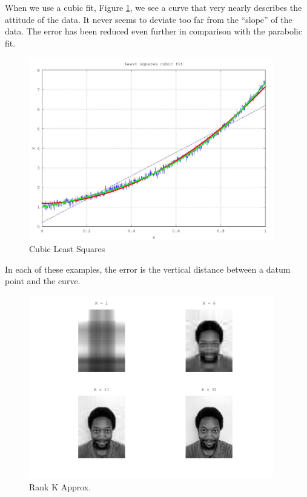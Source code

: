 \documentclass[12pt,letterpaper]{article}
\begin{document}
  \pagebreak

  When we use a cubic fit, Figure \ref{fig:cubic_least_squares}, we see a curve that very nearly describes the attitude of the data. It never seems to deviate too far from the ``slope'' of the data. The error has been reduced even further in comparison with the parabolic fit.

  \begin{figure}[h]
    \centering
    \includegraphics[width=0.95\textwidth]{least_squares_cubic.jpg}
    \caption{Cubic Least Squares}
    \label{fig:cubic_least_squares}
  \end{figure}

  In each of these examples, the error is the vertical distance between a datum point and the curve.

  \begin{figure}[h]
    \centering
    \includegraphics[width=0.95\textwidth]{rank_k.jpg}
    \caption{Rank K Approx.}
    \label{fig:rank_k}
  \end{figure}
\end{document}
